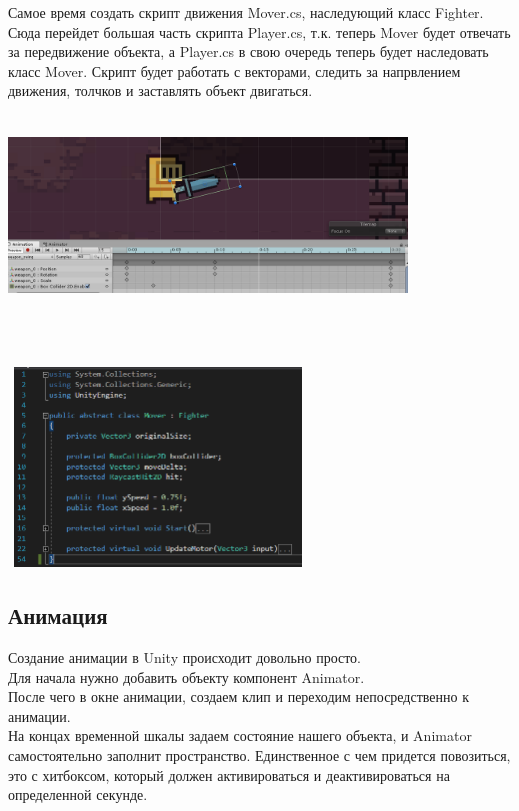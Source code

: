 \documentclass[a4paper,12pt]{article}
\begin{document}
Самое время создать скрипт движения Mover.cs, наследующий класс Fighter. Сюда перейдет большая часть скрипта Player.cs, т.к. теперь Mover будет отвечать за передвижение объекта, а Player.cs в свою очередь теперь будет наследовать класс Mover. Скрипт будет работать с векторами, следить за напрвлением движения, толчков и заставлять объект двигаться.\\
\centerline{\includegraphics[width = 400px, height=200px]{pictures/anim.png}} \\
\centerline{\includegraphics[width = 300px, height=200px]{pictures/mover.png}} 

\newpage
\subsection{Анимация}
Создание анимации в Unity происходит довольно просто. \\
Для начала нужно добавить объекту компонент Animator. \\
После чего в окне анимации, создаем клип и переходим непосредственно к анимации. \\
На концах временной шкалы задаем состояние нашего объекта, и Animator самостоятельно заполнит пространство. Единственное с чем придется повозиться, это с хитбоксом, который должен активироваться и деактивироваться на определенной секунде.\\
\end{document}
